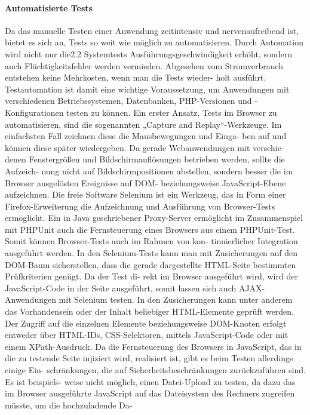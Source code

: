 \paragraph{Automatisierte Tests}
Da das manuelle Testen einer Anwendung zeitintensiv und nervenaufreibend ist, bietet es
sich an, Tests so weit wie möglich zu automatisieren. Durch Automation wird nicht nur die2.2 Systemtests
Ausführungsgeschwindigkeit erhöht, sondern auch Flüchtigkeitsfehler werden vermieden.
Abgesehen vom Stromverbrauch entstehen keine Mehrkosten, wenn man die Tests wieder-
holt ausführt. Testautomation ist damit eine wichtige Voraussetzung, um Anwendungen
mit verschiedenen Betriebssystemen, Datenbanken, PHP-Versionen und -Konfigurationen
testen zu können.
Ein erster Ansatz, Tests im Browser zu automatisieren, sind die sogenannten „Capture and
Replay“-Werkzeuge. Im einfachsten Fall zeichnen diese die Mausbewegungen und Einga-
ben auf und können diese später wiedergeben. Da gerade Webanwendungen mit verschie-
denen Fenstergrößen und Bildschirmauflösungen betrieben werden, sollte die Aufzeich-
nung nicht auf Bildschirmpositionen abstellen, sondern besser die im Browser ausgelösten
Ereignisse auf DOM- beziehungsweise JavaScript-Ebene aufzeichnen.
Die freie Software Selenium ist ein Werkzeug, das in Form einer Firefox-Erweiterung die
Aufzeichnung und Ausführung von Browser-Tests ermöglicht. Ein in Java geschriebener
Proxy-Server ermöglicht im Zusammenspiel mit PHPUnit auch die Fernsteuerung eines
Browsers aus einem PHPUnit-Test. Somit können Browser-Tests auch im Rahmen von kon-
tinuierlicher Integration ausgeführt werden.
In den Selenium-Tests kann man mit Zusicherungen auf den DOM-Baum sicherstellen,
dass die gerade dargestellte HTML-Seite bestimmten Prüfkriterien genügt. Da der Test di-
rekt im Browser ausgeführt wird, wird der JavaScript-Code in der Seite ausgeführt, somit
lassen sich auch AJAX-Anwendungen mit Selenium testen.
In den Zusicherungen kann unter anderem das Vorhandensein oder der Inhalt beliebiger
HTML-Elemente geprüft werden. Der Zugriff auf die einzelnen Elemente beziehungsweise
DOM-Knoten erfolgt entweder über HTML-IDs, CSS-Selektoren, mittels JavaScript-Code
oder mit einem XPath-Ausdruck. Da die Fernsteuerung des Browsers in JavaScript, das in
die zu testende Seite injiziert wird, realisiert ist, gibt es beim Testen allerdings einige Ein-
schränkungen, die auf Sicherheitsbeschränkungen zurückzuführen sind. Es ist beispiels-
weise nicht möglich, einen Datei-Upload zu testen, da dazu das im Browser ausgeführte
JavaScript auf das Dateisystem des Rechners zugreifen müsste, um die hochzuladende Da-
